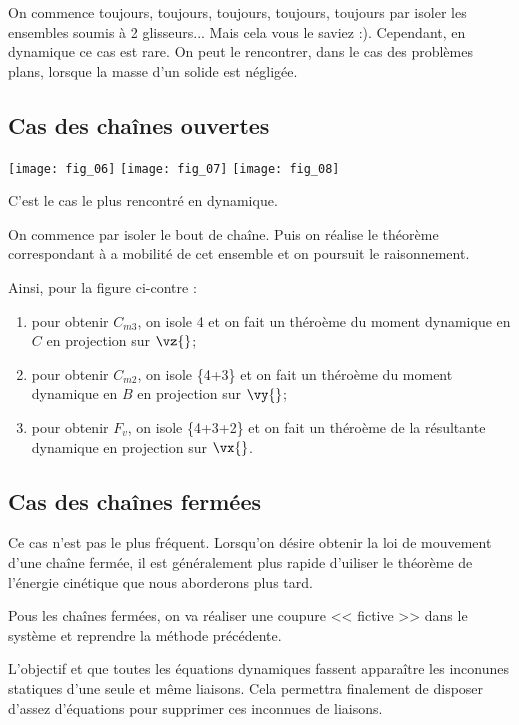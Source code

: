 On commence toujours, \large{toujours}, \Large{toujours}, \LARGE{toujours}, \huge{toujours} \normalsize par isoler les ensembles soumis à 2 glisseurs... Mais cela vous le saviez :). Cependant, en dynamique ce cas est rare. On peut le rencontrer, dans le cas des problèmes plans, lorsque la masse d'un solide est négligée.


\subsection{Cas des chaînes ouvertes}

\begin{marginfigure}
\texttt{[image: fig\_06]}
\texttt{[image: fig\_07]}
\texttt{[image: fig\_08]}
\end{marginfigure}

C'est le cas le plus rencontré en dynamique. 

On commence par isoler le bout de chaîne. Puis on réalise le théorème correspondant à a mobilité de cet ensemble et on poursuit le raisonnement. 



Ainsi, pour la figure ci-contre :
\begin{enumerate}
\item pour obtenir $C_{m3}$, on isole 4 et on fait un théroème du moment dynamique en $C$ en projection sur $\vz{}$;
\item pour obtenir $C_{m2}$, on isole \{4+3\} et on fait un théroème du moment dynamique en $B$ en projection sur $\vy{}$;
\item pour obtenir $F_{v}$, on isole \{4+3+2\} et on fait un théroème de la résultante dynamique en projection sur $\vx{}$.
\end{enumerate}


\subsection{Cas des chaînes fermées}

Ce cas n'est pas le plus fréquent. Lorsqu'on désire obtenir la loi de mouvement d'une chaîne fermée, il est généralement plus rapide d'uiliser le théorème de l'énergie cinétique que nous aborderons plus tard. 

Pous les chaînes fermées, on va réaliser une coupure << fictive >> dans le système et reprendre la méthode précédente. 

L'objectif et que toutes les équations dynamiques fassent apparaître les inconunes statiques d'une seule et même liaisons. Cela permettra finalement de disposer d'assez d'équations pour supprimer ces inconnues de liaisons.

